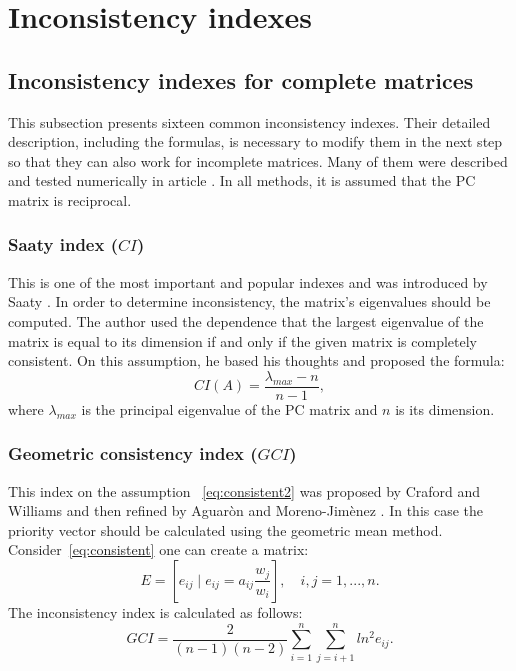 \chapter{Inconsistency indexes}
\label{sec:inconsistencyIndexes}
\section{Inconsistency indexes for complete matrices}

This subsection presents sixteen common inconsistency indexes. Their detailed description, including the formulas, is necessary to modify them in the next step so that they can also work for incomplete matrices. Many of them were described and tested numerically in article \cite{Brunelli2013}. In all methods, it is assumed that the PC matrix is reciprocal.


 \subsection{Saaty index ($CI$)}

This is one of the most important and popular indexes and was introduced by Saaty \cite{SAATY1977}. In order to determine inconsistency, the matrix's eigenvalues should be computed. The author used the dependence that the largest eigenvalue of the matrix is equal to its dimension if and only if the given matrix is completely consistent. On this assumption, he based his thoughts and proposed the formula:
	\begin{equation} 
		CI(A)=\frac{\lambda_{max}-n}{n-1},
	 \end{equation}
 where $\lambda_{max}$
  is the principal eigenvalue of the PC matrix and $n$
  is its dimension.


\subsection{Geometric consistency index ($GCI$)}

This index on the assumption ~\ref{eq:consistent2} was proposed by Craford and Williams \cite{CRAWFORD1985} and then refined by Aguaròn and Moreno-Jimènez \cite{AGUARON2003}. In this case the priority vector should be calculated using the geometric mean method. Consider~\ref{eq:consistent} one can create a matrix:
	\begin{equation} 
		E=\left[e_{ij}\mid e_{ij}=a_{ij}\frac{w_{j}}{w_{i}}\right],\,\,\,\,\,\,i,j=1,...,n.
	 \end{equation}
 The inconsistency index is calculated as follows:
	 \begin{equation} 
		\label{eq:GCI}
		GCI=\frac{2}{(n-1)(n-2)}\sum_{i=1}^{n}\sum_{j=i+1}^{n}ln^{2}e_{ij}.
	 \end{equation}
 

